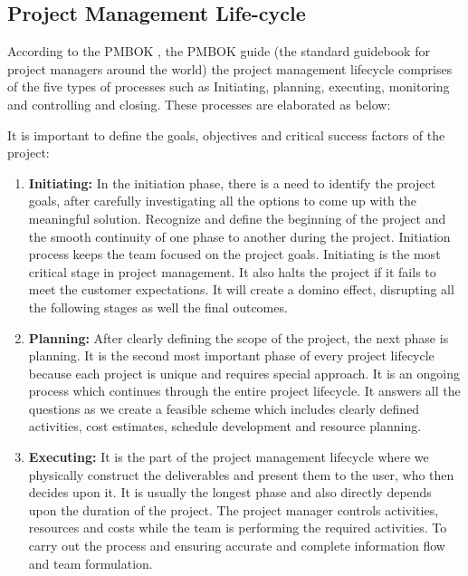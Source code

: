 \subsection{Project Management Life-cycle}
\label{subsec:subsec01}
According to the PMBOK \cite{PMBOK2013}, the PMBOK guide (the standard guidebook for project managers around the world) the project management lifecycle comprises of the five types of processes such as Initiating, planning, executing, monitoring and controlling and closing. These processes are elaborated as below: 
 
It is important to define the goals, objectives and critical success factors of the project:
\begin{enumerate}
    \item \textbf{Initiating:} In the initiation phase, there is a need to identify the project goals, after carefully investigating all the options to come up with the meaningful solution. Recognize and define the beginning of the project and the smooth continuity of one phase to another during the project. Initiation process keeps the team focused on the project goals. Initiating is the most critical stage in project management. It also halts the project if it fails to meet the customer expectations. It will create a domino effect, disrupting all the following stages as well the final outcomes.

    \item \textbf{Planning:} After clearly defining the scope of the project, the next phase is planning. It is the second most important phase of every project lifecycle because each project is unique and requires special approach. It is an ongoing process which continues through the entire project lifecycle. It answers all the questions as we create a feasible scheme which includes clearly defined activities, cost estimates, schedule development and resource planning.

    \item \textbf{Executing:} It is the part of the project management lifecycle where we physically construct the deliverables and present them to the user, who then decides upon it. It is usually the longest phase and also directly depends upon the duration of the project. The project manager controls activities, resources and costs while the team is performing the required activities. To carry out the process and ensuring accurate and complete information flow and team formulation.


\end{enumerate}
